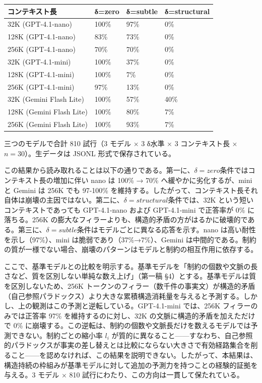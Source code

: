 \documentclass[12pt,a4paper]{article}
\begin{document}
{\def\LTcaptype{table} %
\begin{longtable}[]{@{}llll@{}}
\toprule\noalign{}
コンテキスト長 & δ=zero & δ=subtle & δ=structural \\
\midrule\noalign{}
\endhead
\bottomrule\noalign{}
\endlastfoot
32K (GPT-4.1-nano) & 100\% & 97\% & 0\% \\
128K (GPT-4.1-nano) & 83\% & 73\% & 0\% \\
256K (GPT-4.1-nano) & 70\% & 70\% & 0\% \\
32K (GPT-4.1-mini) & 100\% & 37\% & 0\% \\
128K (GPT-4.1-mini) & 100\% & 7\% & 0\% \\
256K (GPT-4.1-mini) & 97\% & 13\% & 0\% \\
32K (Gemini Flash Lite) & 100\% & 57\% & 40\% \\
128K (Gemini Flash Lite) & 100\% & 80\% & 7\% \\
256K (Gemini Flash Lite) & 100\% & 93\% & 7\% \\
\end{longtable}
}

三つのモデルで合計 810 試行（3 モデル × 3 δ水準 × 3 コンテキスト長 × \(n=30\)）。生データは JSONL 形式で保存されている。

この結果から読み取れることは以下の通りである。第一に、\(\delta=zero\)条件ではコンテキスト長の増加に伴い nano は 100\% → 70\% へ緩やかに劣化するが、mini と Gemini は 256K でも 97-100\% を維持する。したがって、コンテキスト長それ自体は崩壊の主因ではない。第二に、\(\delta=structural\)条件では、32K という短いコンテキストであっても GPT-4.1-nano および GPT-4.1-mini で正答率が 0\% に落ちる。256K の膨大なフィラーよりも、構造的矛盾の方がはるかに破壊的である。第三に、\(\delta=subtle\)条件はモデルごとに異なる応答を示す。nano は高い耐性を示し（97\%）、mini は脆弱であり（37\%→7\%）、Gemini は中間的である。制約の質が一様でない場合、崩壊のパターンはモデルと制約の相互作用に依存する。

ここで、基準モデルとの比較を明示する。基準モデルを「制約の個数や文脈の長さなど、質を区別しない単純な数え上げ」（第一稿 §4）とする。基準モデルは質を区別しないため、256K トークンのフィラー（数千件の事実文）が構造的矛盾（自己参照パラドックス）より大きな累積構造消耗量を与えると予測する。しかし、上の観測はこの予測と逆転している。GPT-4.1-mini では、256K フィラーのみでは正答率 97\% を維持するのに対し、32K の文脈に構造的矛盾を加えただけで 0\% に崩壊する。この逆転は、制約の個数や文脈長だけを数えるモデルでは予測できない。制約ごとの縮小率 \(l_{i}\) が質的に異なること------すなわち、自己参照的パラドックスが事実の差し替えとは比較にならない大きさで有効経路集合を削ること------を認めなければ、この結果を説明できない。したがって、本結果は、構造持続の枠組みが基準モデルに対して追加の予測力を持つことの経験的証拠を与える。3 モデル × 810 試行にわたり、この方向は一貫して保たれている。
\end{document}
